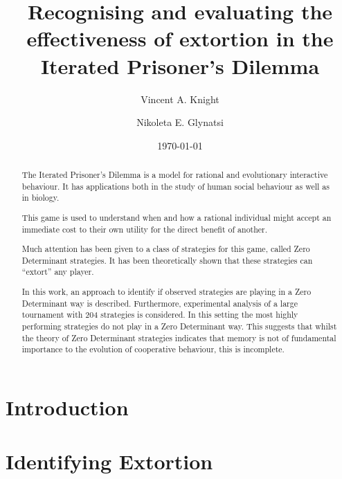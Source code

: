 \documentclass[a4paper]{article}
\title{Recognising and evaluating the effectiveness
       of extortion in the Iterated Prisoner's Dilemma}
\author{Vincent A. Knight \and Nikoleta E. Glynatsi}
\date{\today}
\begin{document}
\maketitle

\begin{abstract}
    The Iterated Prisoner's Dilemma is a model for rational and evolutionary
    interactive behaviour. It has applications both in the study of human social
    behaviour as well as in biology.

    This game is used to understand when and how a rational individual might
    accept an immediate cost to their own utility for the direct benefit of
    another.

    Much attention has been given to a class of strategies for this game, called
    Zero Determinant strategies. It has been theoretically shown that these
    strategies can ``extort'' any player.

    In this work, an approach to identify if observed strategies are playing in
    a Zero Determinant way is described. Furthermore, experimental analysis of
    a large tournament with 204 %
    strategies is considered. In this setting
    the most highly performing strategies do not play in a Zero Determinant way.
    This suggests that whilst the theory of Zero Determinant strategies
    indicates that memory is not of fundamental importance to the evolution of
    cooperative behaviour, this is incomplete.
\end{abstract}

\section{Introduction}\label{sec:introduction}


\section{Identifying Extortion}\label{sec:delta-zd-strategies}



\end{document}

